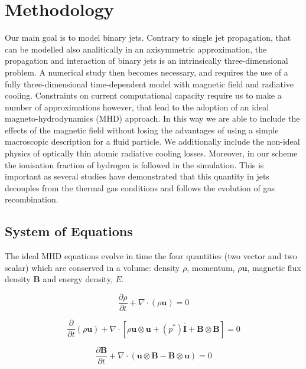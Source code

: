 \documentclass{aa}
\begin{document}
\section{Methodology}\label{Simulation_And_Code}
Our main goal is to model binary jets. 
Contrary to single jet propagation, 
that can be modelled also analitically in an 
axisymmetric approximation, the propagation and interaction
of binary jets is an intrinsically three-dimensional problem.
A numerical study then becomes necessary, 
and requires the use of a fully 
three-dimensional time-dependent model with magnetic field and 
radiative cooling.
Constraints on current computational capacity require us to make 
a number of approximations however, 
that lead to the adoption of an ideal
magneto-hydrodynamics (MHD) approach. 
In this way we are able to include the 
effects of the magnetic field without losing the 
advantages of using a simple macroscopic 
description for a fluid particle.
We additionally include the non-ideal physics of optically thin atomic 
radiative cooling losses. 
Moreover, in our scheme 
the ionisation fraction of hydrogen is followed in the simulation.
This is important as several studies
\citep{ 1999A&A...342..717B,2006A&A...456..189P}
have demonstrated that this quantity in jets decouples
from the thermal gas conditions and follows the evolution of 
gas recombination.

\subsection{System of Equations}
The ideal MHD equations evolve in time 
the four quantities (two vector and two
scalar) which are conserved in a volume:
density $\rho$, momentum, $\rho \mathbf u$, 
magnetic flux density $\mathbf B$ and energy density, $E$.


\begin{equation}
\frac{\partial \rho}{\partial t}+\nabla\cdot(\rho \mathbf u)=0
\end{equation}

\begin{equation}
\frac{\partial}{\partial t}\left(
\rho \mathbf u
\right)
+\nabla
\cdot
\left[
\rho \mathbf u \otimes \mathbf u
+\left(
p^*
\right)
\mathbf {{\overline {\overline I}}}
+\mathbf{B} \otimes \mathbf{B}
\right]
=0
\end{equation}

\begin{equation}
\frac{\partial \mathbf{B} }{\partial t}+
\nabla
\cdot
(
\mathbf{u} \otimes \mathbf{B}-
\mathbf{B} \otimes \mathbf{u})
= 0
\end{equation}
\end{document}
